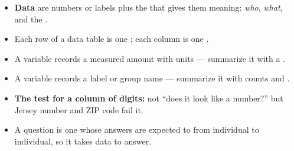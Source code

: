 \boxguard[14]
\begin{tcolorbox}[enhanced, colback=frost, colframe=cerulean, boxrule=0.8pt, arc=2mm,
    left=3mm, right=3mm, top=1.5mm, bottom=1.5mm, breakable,
    fonttitle=\bfseries\small\color{white}, title={QuickNotes: Naming What You Found},
    attach boxed title to top left={yshift=-2mm, xshift=4mm},
    boxed title style={colback=cerulean, colframe=cerulean, arc=1.5mm}]
\small
\begin{itemize}[leftmargin=1.1em, itemsep=5pt]
  \item \textbf{Data} are numbers or labels plus the  that gives them meaning:
        \emph{who}, \emph{what}, and the .
  \item Each row of a data table is one ; each column is one .
  \item A  variable records a measured amount with units --- summarize
        it with a .
  \item A  variable records a label or group name --- summarize it with
        counts and .
  \item \textbf{The test for a column of digits:} not ``does it look like a number?'' but
         Jersey number and ZIP code fail it.
  \item A  question is one whose answers are expected to 
        from individual to individual, so it takes data to answer.
\end{itemize}
\end{tcolorbox}

